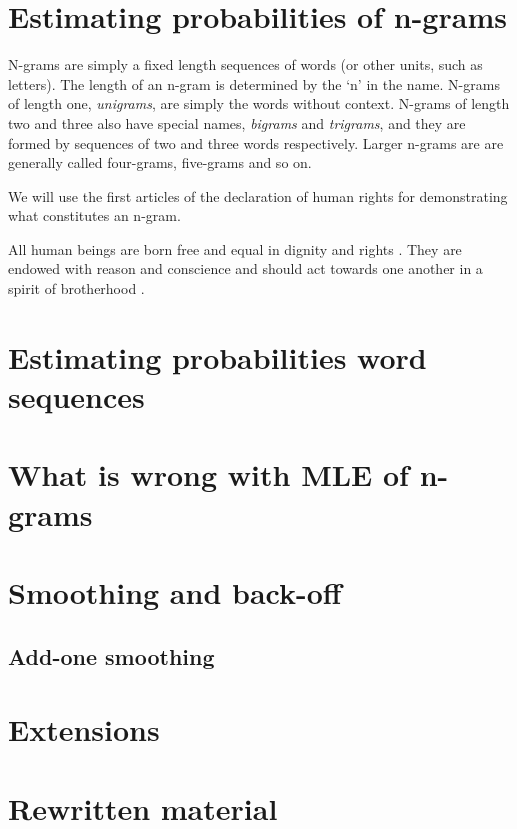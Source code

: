\section{Estimating probabilities of n-grams}

N-grams are simply a fixed length sequences of words
(or other units, such as letters).
The length of an n-gram is determined by the `n' in the name.
N-grams of length one, \emph{unigrams}, are simply the words without context.
N-grams of length two and three also have special names,
\emph{bigrams} and \emph{trigrams},
and they are formed by sequences of two and three words respectively.
Larger n-grams are are generally called four-grams, five-grams and so on.

We will use the first articles of the declaration of human rights
for demonstrating what constitutes an n-gram.

\begin{tcolorbox}
All human beings are born free and equal in dignity and rights .
They are endowed with reason and conscience and should act towards one another in a spirit of brotherhood .
\end{tcolorbox}


\section{Estimating probabilities word sequences}

\section{What is wrong with MLE of n-grams}

\section{Smoothing and back-off}

\subsection{Add-one smoothing}

\section{Extensions}

\section{Rewritten material}

